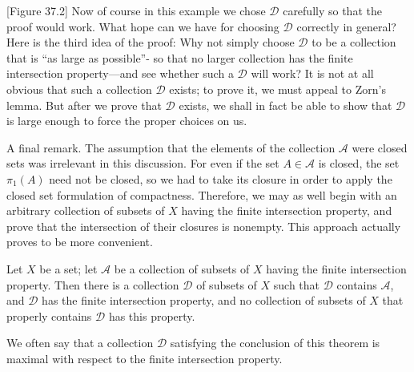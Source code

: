 [Figure 37.2]
Now of course in this example we chose \(\mathcal{D}\) carefully so that the proof would work. What hope can we have for choosing \(\mathcal{D}\) correctly in general? Here is the third idea of the proof: Why not simply choose \(\mathcal{D}\) to be a collection that is ``as large as possible''- so that no larger collection has the finite intersection property—and see whether such a \(\mathcal{D}\) will work? It is not at all obvious that such a collection \(\mathcal{D}\) exists; to prove it, we must appeal to Zorn's lemma. But after we prove that \(\mathcal{D}\) exists, we shall in fact be able to show that \(\mathcal{D}\) is large enough to force the proper choices on us.

A final remark. The assumption that the elements of the collection \(\mathcal{A}\) were closed sets was irrelevant in this discussion. For even if the set \(A \in \mathcal{A}\) is closed, the set \({\pi }_{1}(A)\) need not be closed, so we had to take its closure in order to apply the closed set formulation of compactness. Therefore, we may as well begin with an arbitrary collection of subsets of \(X\) having the finite intersection property, and prove that the intersection of their closures is nonempty. This approach actually proves to be more convenient.

\begin{lemma}
\label{lem:\thetheorem}
 Let \(X\) be a set; let \(\mathcal{A}\) be a collection of subsets of \(X\) having the finite intersection property. Then there is a collection \(\mathcal{D}\) of subsets of \(X\) such that \(\mathcal{D}\) contains \(\mathcal{A}\), and \(\mathcal{D}\) has the finite intersection property, and no collection of subsets of \(X\) that properly contains \(\mathcal{D}\) has this property.
\end{lemma}

We often say that a collection \(\mathcal{D}\) satisfying the conclusion of this theorem is maximal with respect to the finite intersection property.

